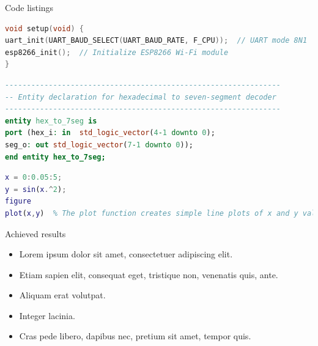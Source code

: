 \documentclass[aspectratio=1610]{beamer}
\begin{document}
\begin{frame}[fragile]{Code listings}

\begin{lstlisting}[language=C,title={Sample code in C}]
void setup(void) {
uart_init(UART_BAUD_SELECT(UART_BAUD_RATE, F_CPU));  // UART mode 8N1
esp8266_init();  // Initialize ESP8266 Wi-Fi module
}
\end{lstlisting}
\vfill

\begin{lstlisting}[language=vhdl,title={Sample code in VHDL}]
---------------------------------------------------------------
-- Entity declaration for hexadecimal to seven-segment decoder
---------------------------------------------------------------
entity hex_to_7seg is
port (hex_i: in  std_logic_vector(4-1 downto 0);
seg_o: out std_logic_vector(7-1 downto 0));
end entity hex_to_7seg;
\end{lstlisting}

\begin{lstlisting}[language=Matlab,title={Sample code in Matlab}]
x = 0:0.05:5;
y = sin(x.^2);
figure
plot(x,y)  % The plot function creates simple line plots of x and y values
\end{lstlisting}
\end{frame}

\begin{frame}{Achieved results}
\begin{itemize}
\item Lorem ipsum dolor sit amet, consectetuer adipiscing elit.
\item Etiam sapien elit, consequat eget, tristique non, venenatis quis, ante.
\item Aliquam erat volutpat.
\item Integer lacinia.
\item Cras pede libero, dapibus nec, pretium sit amet, tempor quis.
\end{itemize}
\end{frame}
\end{document}
